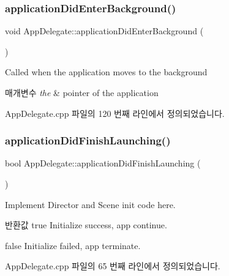 \subsubsection{\texorpdfstring{application\+Did\+Enter\+Background()}{applicationDidEnterBackground()}}
{\footnotesize\ttfamily void App\+Delegate\+::application\+Did\+Enter\+Background (\begin{DoxyParamCaption}{ }\end{DoxyParamCaption})\hspace{0.3cm}{\ttfamily [virtual]}}



Called when the application moves to the background 


\begin{DoxyParams}{매개변수}
{\em the} & pointer of the application \\
\hline
\end{DoxyParams}


App\+Delegate.\+cpp 파일의 120 번째 라인에서 정의되었습니다.

\mbox{\label{class_app_delegate_a68cbaed49edf7581dc59a09d5062fff3}} 
\subsubsection{\texorpdfstring{application\+Did\+Finish\+Launching()}{applicationDidFinishLaunching()}}
{\footnotesize\ttfamily bool App\+Delegate\+::application\+Did\+Finish\+Launching (\begin{DoxyParamCaption}{ }\end{DoxyParamCaption})\hspace{0.3cm}{\ttfamily [virtual]}}



Implement Director and Scene init code here. 

\begin{DoxyReturn}{반환값}
true Initialize success, app continue. 

false Initialize failed, app terminate. 
\end{DoxyReturn}


App\+Delegate.\+cpp 파일의 65 번째 라인에서 정의되었습니다.

\mbox{\label{class_app_delegate_ac4d653e3f74a91efef5f2def58fe3108}} 
